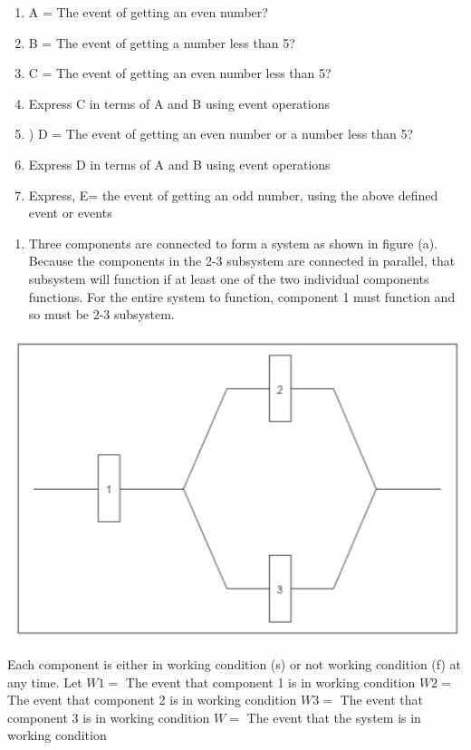 \documentclass[]{book}
\providecommand{\tightlist}{%
  \setlength{\itemsep}{0pt}\setlength{\parskip}{0pt}}
\begin{document}
\begin{enumerate}
\def\labelenumi{(\alph{enumi})}
\tightlist
\item
  A = The event of getting an even number?
\item
  B = The event of getting a number less than 5?
\item
  C = The event of getting an even number less than 5?
\item
  Express C in terms of A and B using event operations
\item
  ) D = The event of getting an even number or a number less than 5?
\item
  Express D in terms of A and B using event operations
\item
  Express, E= the event of getting an odd number, using the above defined event or events
\end{enumerate}

\begin{enumerate}
\def\labelenumi{\arabic{enumi}.}
\setcounter{enumi}{10}
\tightlist
\item
  Three components are connected to form a system as shown in figure (a). Because the components in the 2-3 subsystem are connected in parallel, that subsystem will function if at least one of the two individual components functions. For the entire system to function, component 1 must function and so must be 2-3 subsystem.
\end{enumerate}

\begin{center}\includegraphics[width=0.8\linewidth]{figure/Chapter7a} \end{center}

Each component is either in working condition (s) or not working condition (f) at any time.
Let
\(W1 =\) The event that component 1 is in working condition
\(W2 =\) The event that component 2 is in working condition
\(W3 =\) The event that component 3 is in working condition
\(W =\) The event that the system is in working condition
\end{document}
